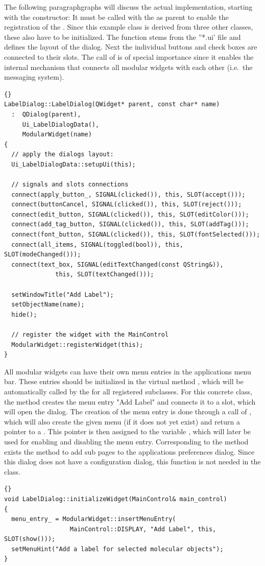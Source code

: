The following paragraphgraphs will discuss the actual implementation, starting with the 
constructor: It must be called with the  as parent to enable the 
registration of the .
Since this example class is derived from three other classes, these also have to
be initialized. 
The function  stems from the ''*.ui' file and defines the layout of the dialog.
Next the individual buttons and check boxes are connected to their slots.
The call of  is of special importance since it enables the internal 
mechanism that connects all modular widgets with each other (i.e.\ the messaging system).
\begin{lstlisting}{}
LabelDialog::LabelDialog(QWidget* parent, const char* name)
  :  QDialog(parent),
     Ui_LabelDialogData(),
     ModularWidget(name)
{
  // apply the dialogs layout:
  Ui_LabelDialogData::setupUi(this);

  // signals and slots connections
  connect(apply_button_, SIGNAL(clicked()), this, SLOT(accept()));
  connect(buttonCancel, SIGNAL(clicked()), this, SLOT(reject()));
  connect(edit_button, SIGNAL(clicked()), this, SLOT(editColor()));
  connect(add_tag_button, SIGNAL(clicked()), this, SLOT(addTag()));
  connect(font_button, SIGNAL(clicked()), this, SLOT(fontSelected()));
  connect(all_items, SIGNAL(toggled(bool)), this, SLOT(modeChanged()));
  connect(text_box, SIGNAL(editTextChanged(const QString&)), 
              this, SLOT(textChanged()));

  setWindowTitle("Add Label");
  setObjectName(name);
  hide();

  // register the widget with the MainControl
  ModularWidget::registerWidget(this);
}
\end{lstlisting}

All modular widgets can have their own menu entries in the applications menu bar.
These entries should be initialized in the virtual method 
, which will be automatically called by the 
for all registered  subclasses.
For this concrete class, the method creates the menu entry "Add Label" and connects 
it to a slot, which will open the dialog. 
The creation of the menu entry is done through a call of , 
which will also create the given menu (if it does not yet exist) and return a pointer to 
a . 
This pointer is then assigned to the variable , which will later be used for 
enabling and disabling the menu entry.
Corresponding to the method  exists the  method to add sub pages to the applications preferences dialog. 
Since this dialog does not have a configuration dialog, this function is not needed in 
the  class.
\begin{lstlisting}{}
void LabelDialog::initializeWidget(MainControl& main_control)
{
  menu_entry_ = ModularWidget::insertMenuEntry(
                  MainControl::DISPLAY, "Add Label", this, SLOT(show()));
  setMenuHint("Add a label for selected molecular objects");   
}
\end{lstlisting}


